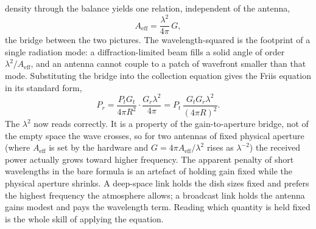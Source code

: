 density through the balance yields one relation, independent of the
antenna,
\[
A_{\text{eff}} = \frac{\lambda^2}{4\pi}\,G,
\]
the bridge between the two pictures. The wavelength-squared is the
footprint of a single radiation mode: a diffraction-limited beam fills a
solid angle of order $\lambda^2/A_{\text{eff}}$, and an antenna cannot
couple to a patch of wavefront smaller than that mode. Substituting the
bridge into the collection equation gives the Friis equation in its
standard form,
\[
P_r = \frac{P_t G_t}{4\pi R^2}\cdot \frac{G_r \lambda^2}{4\pi} =
P_t\,\frac{G_t G_r \lambda^2}{(4\pi R)^2}.
\]
The $\lambda^2$ now reads correctly. It is a property of the
gain-to-aperture bridge, not of the empty space the wave crosses, so for
two antennas of fixed physical aperture (where $A_{\text{eff}}$ is set by
the hardware and $G = 4\pi A_{\text{eff}}/\lambda^2$ rises as
$\lambda^{-2}$) the received power actually grows toward higher frequency.
The apparent penalty of short wavelengths in the bare formula is an
artefact of holding gain fixed while the physical aperture shrinks. A
deep-space link holds the dish sizes fixed and prefers the highest
frequency the atmosphere allows; a broadcast link holds the antenna gains
modest and pays the wavelength term. Reading which quantity is held fixed
is the whole skill of applying the equation.

